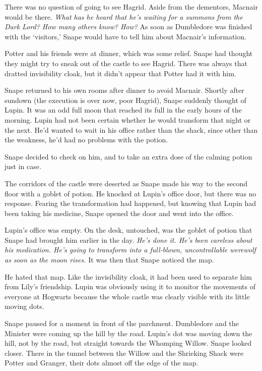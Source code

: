 \documentclass[a4paper,11pt]{article}
\begin{document}
There was no question of going to see Hagrid. Aside from the dementors, Macnair would be there. \emph{What has he heard that he's waiting for a summons from the Dark Lord? How many others know? How?} As soon as Dumbledore was finished with the `visitors,' Snape would have to tell him about Macnair's information.

Potter and his friends were at dinner, which was some relief. Snape had thought they might try to sneak out of the castle to see Hagrid. There was always that dratted invisibility cloak, but it didn't appear that Potter had it with him.

Snape returned to his own rooms after dinner to avoid Macnair. Shortly after sundown (the execution is over now, poor Hagrid), Snape suddenly thought of Lupin. It was an odd full moon that reached its full in the early hours of the morning. Lupin had not been certain whether he would transform that night or the next. He'd wanted to wait in his office rather than the shack, since other than the weakness, he'd had no problems with the potion.

Snape decided to check on him, and to take an extra dose of the calming potion just in case.

The corridors of the castle were deserted as Snape made his way to the second floor with a goblet of potion. He knocked at Lupin's office door, but there was no response. Fearing the transformation had happened, but knowing that Lupin had been taking his medicine, Snape opened the door and went into the office.

Lupin's office was empty. On the desk, untouched, was the goblet of potion that Snape had brought him earlier in the day. \emph{He's done it. He's been careless about his medication. He's going to transform into a full-blown, uncontrollable werewolf as soon as the moon rises.} It was then that Snape noticed the map.

He hated that map. Like the invisibility cloak, it had been used to separate him from Lily's friendship. Lupin was obviously using it to monitor the movements of everyone at Hogwarts because the whole castle was clearly visible with its little moving dots.

Snape paused for a moment in front of the parchment. Dumbledore and the Minister were coming up the hill by the road. Lupin's dot was moving down the hill, not by the road, but straight towards the Whomping Willow. Snape looked closer. There in the tunnel between the Willow and the Shrieking Shack were Potter and Granger, their dots almost off the edge of the map.
\end{document}
